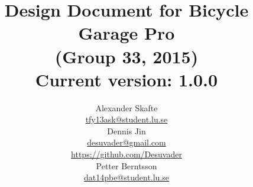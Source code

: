 \title{
	Design Document for Bicycle Garage Pro\\
	(Group 33, 2015)\\
	\vspace{0.2in}
	\normalsize Current version: 1.0.0
}
\author{
	Alexander Skafte\\
	\url{tfy13ask@student.lu.se}\\
	Dennis Jin\\
	\url{desuvader@gmail.com}\\
	\url{https://github.com/Desuvader}\\
	Petter Berntsson\\
	\url{dat14pbe@student.lu.se}
}
\date{}

